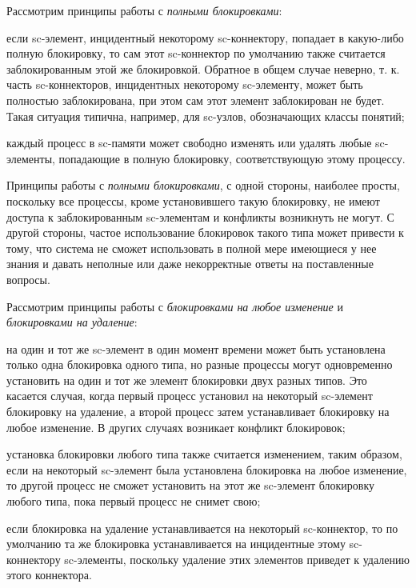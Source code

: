 Рассмотрим принципы работы с \textit{полными блокировками}:
\begin{textitemize}
	\item если sc-элемент, инцидентный некоторому sc-коннектору, попадает в какую-либо полную блокировку, то сам этот sc-коннектор по умолчанию также считается заблокированным этой же блокировкой. Обратное в общем случае неверно, т. к. часть sc-коннекторов, инцидентных некоторому sc-элементу, может быть полностью заблокирована, при этом сам этот элемент заблокирован не будет. Такая ситуация типична, например, для sc-узлов, обозначающих классы понятий;
	\item каждый процесс в sc-памяти может свободно изменять или удалять любые sc-элементы, попадающие в полную блокировку, соответствующую этому процессу.
\end{textitemize}

Принципы работы с \textit{полными блокировками}, с одной стороны, наиболее просты, поскольку все процессы, кроме установившего такую блокировку, не имеют доступа к заблокированным \mbox{sc-элементам} и конфликты возникнуть не могут. С другой стороны, частое использование блокировок такого типа может привести к тому, что система не сможет использовать в полной мере имеющиеся у нее знания и давать неполные или даже некорректные ответы на поставленные вопросы.

Рассмотрим принципы работы с \textit{блокировками на любое изменение} и \textit{блокировками на удаление}:
\begin{textitemize}
	\item на один и тот же sc-элемент в один момент времени может быть установлена только одна блокировка одного типа, но разные процессы могут одновременно установить на один и тот же элемент блокировки двух разных типов. Это касается случая, когда первый процесс установил на некоторый sc-элемент блокировку на удаление, а второй процесс затем устанавливает блокировку на любое изменение. В других случаях возникает конфликт блокировок;
	\item установка блокировки любого типа также считается изменением, таким образом, если на некоторый \mbox{sc-элемент} была установлена блокировка на любое изменение, то другой процесс не сможет установить на этот же sc-элемент блокировку любого типа, пока первый процесс не снимет свою;
	\item если блокировка на удаление устанавливается на некоторый sc-коннектор, то по умолчанию та же блокировка устанавливается на инцидентные этому sc-коннектору sc-элементы, поскольку удаление этих элементов приведет к удалению этого коннектора.
\end{textitemize}

